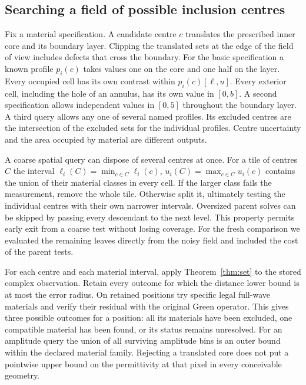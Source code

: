\subsection{Searching a field of possible inclusion centres}
Fix a material specification. A candidate centre $c$ translates the prescribed inner core and its boundary layer. Clipping the translated sets at the edge of the field of view includes defects that cross the boundary. For the basic specification a known profile $p_i(c)$ takes values one on the core and one half on the layer. Every occupied cell has its own contrast within $p_i(c)[\ell,u]$. Every exterior cell, including the hole of an annulus, has its own value in $[0,b]$. A second specification allows independent values in $[0,5]$ throughout the boundary layer. A third query allows any one of several named profiles. Its excluded centres are the intersection of the excluded sets for the individual profiles. Centre uncertainty and the area occupied by material are different outputs.

A coarse spatial query can dispose of several centres at once. For a tile of centres $C$ the interval $\ell_i(C)=\min_{c\in C}\ell_i(c)$, $u_i(C)=\max_{c\in C}u_i(c)$ contains the union of their material classes in every cell. If the larger class fails the measurement, remove the whole tile. Otherwise split it, ultimately testing the individual centres with their own narrower intervals. Oversized parent solves can be skipped by passing every descendant to the next level. This property permits early exit from a coarse test without losing coverage. For the fresh comparison we evaluated the remaining leaves directly from the noisy field and included the cost of the parent tests.

For each centre and each material interval, apply Theorem~\ref{thm:set} to the stored complex observation. Retain every outcome for which the distance lower bound is at most the error radius. On retained positions try specific legal full-wave materials and verify their residual with the original Green operator. This gives three possible outcomes for a position: all its materials have been excluded, one compatible material has been found, or its status remains unresolved. For an amplitude query the union of all surviving amplitude bins is an outer bound within the declared material family. Rejecting a translated core does not put a pointwise upper bound on the permittivity at that pixel in every conceivable geometry.

